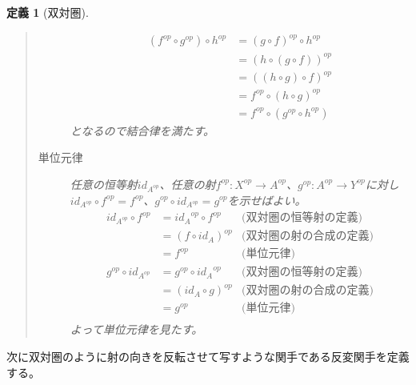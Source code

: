 \documentclass[dvipdfmx]{jsarticle}
\newcommand{\arrow}{\rightarrow}
\newcommand{\mor}[3]{#1:#2\arrow #3}
\newtheorem{define}{定義}[section]
\numberwithin{proof}{subsection}
\numberwithin{prop}{subsection}
\numberwithin{define}{subsection}
\begin{document}
\begin{define}[双対圏]
\begin{quote}
\begin{description}
				\begin{align*}
					(f^{op}\circ g^{op})\circ h^{op}&=(g\circ f)^{op}\circ h^{op}\\
					&=(h\circ(g\circ f))^{op}\\
					&=((h\circ g)\circ f)^{op}\\
					&=f^{op}\circ (h\circ g)^{op}\\
					&=f^{op}\circ (g^{op}\circ h^{op})
				\end{align*}
				となるので結合律を満たす。
				\item[単位元律]任意の恒等射$id_{A^{op}}$、任意の射$\mor{f^{op}}{X^{op}}{A^{op}}$、$\mor{g^{op}}{A^{op}}{Y^{op}}$に対し$id_{A^{op}}\circ f^{op}=f^{op}$、$g^{op}\circ id_{A^{op}}=g^{op}$を示せばよい。
				\begin{align*}
					id_{A^{op}}\circ f^{op}&={id_A}^{op}\circ f^{op}&\text{(双対圏の恒等射の定義)}\\
					&=(f\circ id_A)^{op}&\text{(双対圏の射の合成の定義)}\\
					&=f^{op}&\text{(単位元律)}\\
					g^{op}\circ id_{A^{op}}&=g^{op}\circ {id_A}^{op}&\text{(双対圏の恒等射の定義)}\\
					&=(id_A\circ g)^{op}&\text{(双対圏の射の合成の定義)}\\
					&=g^{op}&\text{(単位元律)}\\
				\end{align*}
				よって単位元律を見たす。
			\end{description}
		\end{quote}
	\end{define}
	次に双対圏のように射の向きを反転させて写すような関手である反変関手を定義する。
\end{document}
